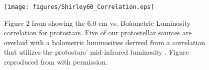 \documentclass[apj]{emulateapj}
\begin{document}
\begin{figure}
\label{fig:shirley60_corr}
\centering
\texttt{[image: figures/Shirley60\_Correlation.eps]}
\caption{\small{Figure 2 from \citet{Shirley07} showing the 6.0 cm vs. Bolometric Luminosity correlation for protostars. Five of our protostellar sources are overlaid with a bolometric luminosities derived from a correlation that utilizes the protostars' mid-infrared luminosity \citep{Kryukova12}. Figure reproduced from \citet{Shirley07} with permission.
}}
\end{figure}




\end{document}
